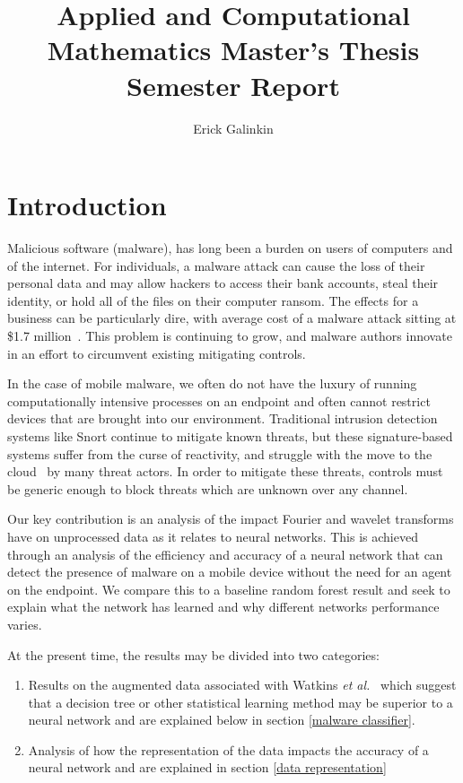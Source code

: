 \documentclass[10pt]{article}
\begin{document}
\title{Applied and Computational Mathematics Master's Thesis Semester Report}
\author{Erick Galinkin}
\maketitle

\section{Introduction}
Malicious software (malware), has long been a burden on users of computers and of  the internet.
For individuals, a malware attack can cause the loss of their personal data and may allow hackers to access their bank accounts, steal their identity, or hold all of the files on their computer ransom.
The effects for a business can be particularly dire, with average cost of a malware attack sitting at \$1.7 million~\cite{seals2019threatlist}.
This problem is continuing to grow, and malware authors innovate in an effort to circumvent existing mitigating controls.

In the case of mobile malware, we often do not have the luxury of running computationally intensive processes on an endpoint and often cannot restrict devices that are brought into our environment.
 Traditional intrusion detection systems like Snort continue to mitigate known threats, but these signature-based systems suffer from the curse of reactivity, and struggle with the move to the cloud~\cite{galinkin2019future} by many threat actors.
 In order to mitigate these threats, controls must be generic enough to block threats which are unknown over any channel.

Our key contribution is an analysis of the impact Fourier and wavelet transforms have on unprocessed data as it relates to neural networks. 
This is achieved through an analysis of the efficiency and accuracy of a neural network that can detect the presence of malware on a mobile device without the need for an agent on the endpoint.
We compare this to a baseline random forest result and seek to explain what the network has learned and why different networks performance varies.

At the present time, the results may be divided into two categories:
\begin{enumerate}
\item Results on the augmented data associated with Watkins \textit{et al.}~\cite{watkins2018network} which suggest that a decision tree or other statistical learning method may be superior to a neural network and are explained below in section \ref{malware classifier}.
\item Analysis of how the representation of the data impacts the accuracy of a neural network and are explained in section \ref{data representation}
\end{enumerate}
\end{document}
